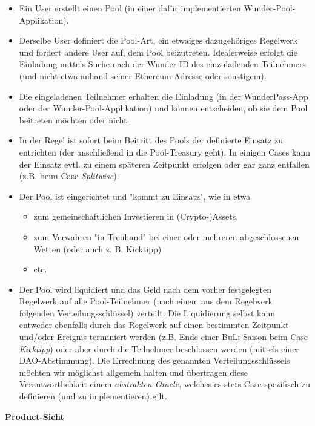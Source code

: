 \begin{itemize}
  \item Ein User erstellt einen Pool (in einer dafür implementierten Wunder-Pool-Applikation).
  \item Derselbe User definiert die Pool-Art, ein etwaiges dazugehöriges Regelwerk und fordert andere User auf, dem Pool beizutreten. Idealerweise erfolgt die Einladung mittels Suche nach der Wunder-ID des einzuladenden Teilnehmers (und nicht etwa anhand seiner Ethereum-Adresse oder sonstigem).
  \item Die eingeladenen Teilnehmer erhalten die Einladung (in der WunderPass-App oder der Wunder-Pool-Applikation) und können entscheiden, ob sie dem Pool beitreten möchten oder nicht. 
  \item In der Regel ist sofort beim Beitritt des Pools der definierte Einsatz zu entrichten (der anschließend in die Pool-Treasury geht). In einigen Cases kann der Einsatz evtl. zu einem späteren Zeitpunkt erfolgen oder gar ganz entfallen (z.B. beim Case \textit{Splitwise}).
  \item Der Pool ist eingerichtet und "kommt zu Einsatz", wie in etwa
  \begin{itemize}
  	\item zum gemeinschaftlichen Investieren in (Crypto-)Assets,
  	\item zum Verwahren "in Treuhand" bei einer oder mehreren abgeschlossenen Wetten (oder auch z. B. Kicktipp)
  	\item etc.
  \end{itemize}
  \item Der Pool wird liquidiert und das Geld nach dem vorher festgelegten Regelwerk auf alle Pool-Teilnehmer (nach einem aus dem Regelwerk folgenden Verteilungsschlüssel) verteilt. Die Liquidierung selbst kann entweder ebenfalls durch das Regelwerk auf einen bestimmten Zeitpunkt und/oder Ereignis terminiert werden (z.B. Ende einer BuLi-Saison beim Case \textit{Kicktipp}) oder aber durch die Teilnehmer beschlossen werden (mittels einer DAO-Abstimmung). Die Errechnung des genannten Verteilungsschlüssels möchten wir möglichst allgemein halten und übertragen diese Verantwortlichkeit einem \textit{abstrakten Oracle}, welches es stets Case-spezifisch zu definieren (und zu implementieren) gilt.
\end{itemize}

\vspace{0.2cm}

\underline{\textbf{Product-Sicht}}

